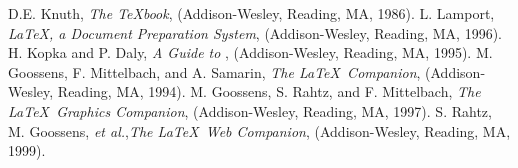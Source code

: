 \documentclass[%
,aps%
 ,twocolumn%
 ,secnumarabic%
,amssymb, amsmath,nobibnotes, aps, prl, floatfix]{revtex4-1}
\begin{document}
\begin{thebibliography}{}\label{sec:TeXbooks}
 D.E. Knuth, \emph{The \TeX book},
(Addison-Wesley, Reading, MA, 1986).
 L. Lamport, \emph{\LaTeX, a Document
Preparation System}, (Addison-Wesley, Reading, MA, 1996).
 H. Kopka and P. Daly, \emph{A Guide to
\LaTeXe}, (Addison-Wesley, Reading, MA, 1995).
 M. Goossens, F. Mittelbach, and
A. Samarin, \emph{The \LaTeX\
Companion}, (Addison-Wesley, Reading, MA, 1994).
 M. Goossens, S. Rahtz, and
F. Mittelbach, \emph{The
\LaTeX\ Graphics Companion}, (Addison-Wesley, Reading, MA, 1997).
\bibitem[Rahtz(1999)]{CompanW} S. Rahtz, M. Goossens, \emph{et
al.},\emph{The \LaTeX\ Web Companion}, (Addison-Wesley, Reading, MA, 1999).
\end{thebibliography}
\end{document}

